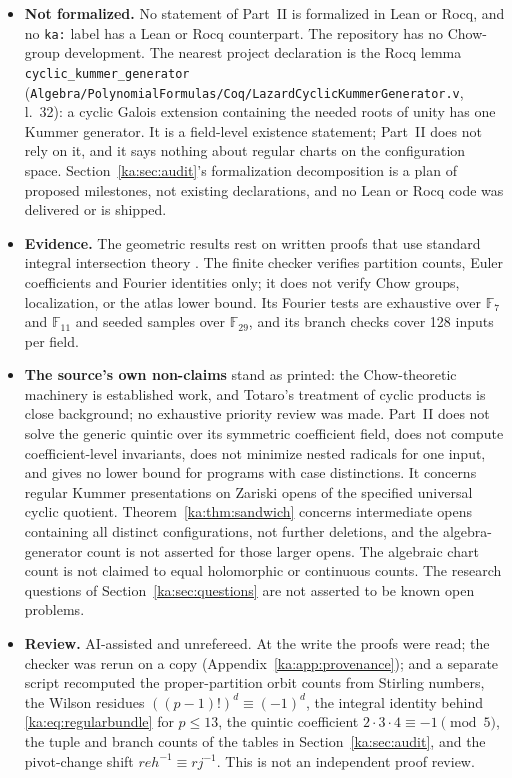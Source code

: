 \documentclass[11pt,a4paper]{article}
\theoremstyle{definition}
\theoremstyle{remark}
\newcommand{\F}{\mathbb F}
\newcommand{\code}[1]{{\small\nolinkurl{#1}}}
\begin{document}
\begin{itemize}
\item \textbf{Not formalized.} No statement of Part~II is formalized in Lean
or Rocq, and no \code{ka:} label has a Lean or Rocq counterpart. The
repository has no Chow-group development. The nearest project declaration
is the Rocq lemma \code{cyclic_kummer_generator}
(\code{Algebra/PolynomialFormulas/Coq/LazardCyclicKummerGenerator.v}, l.~32):
a cyclic Galois extension containing the needed roots of unity has one Kummer
generator. It is a field-level existence statement; Part~II does not rely on
it, and it says nothing about regular charts on the configuration space.
Section~\ref{ka:sec:audit}'s formalization decomposition is a plan of
proposed milestones, not existing declarations, and no Lean or Rocq code was
delivered or is shipped.
\item \textbf{Evidence.} The geometric results rest on written proofs that
use standard integral intersection theory
\cite{ka:Fulton,ka:Totaro,ka:EdidinGraham}. The finite checker verifies
partition counts, Euler coefficients and Fourier identities only; it does not
verify Chow groups, localization, or the atlas lower bound. Its Fourier tests
are exhaustive over $\F_7$ and $\F_{11}$ and seeded samples over $\F_{29}$,
and its branch checks cover 128 inputs per field.
\item \textbf{The source's own non-claims} stand as printed: the Chow-theoretic
machinery is established work, and Totaro's treatment of cyclic products is
close background; no exhaustive priority review was made. Part~II does not
solve the generic quintic over its symmetric coefficient field, does not
compute coefficient-level invariants, does not minimize nested radicals for
one input, and gives no lower bound for programs with case distinctions.
It concerns regular Kummer presentations on Zariski opens of the specified
universal cyclic quotient. Theorem~\ref{ka:thm:sandwich} concerns
intermediate opens containing all distinct configurations, not further
deletions, and the algebra-generator count is not asserted for those larger
opens. The algebraic chart count is not claimed to equal holomorphic or
continuous counts. The research questions of Section~\ref{ka:sec:questions}
are not asserted to be known open problems.
\item \textbf{Review.} AI-assisted and unrefereed. At the write the proofs
were read; the checker was rerun on a copy (Appendix~\ref{ka:app:provenance});
and a separate script recomputed the proper-partition orbit counts from
Stirling numbers, the Wilson residues $((p-1)!)^d\equiv(-1)^d$, the integral
identity behind \eqref{ka:eq:regularbundle} for $p\le13$, the quintic
coefficient $2\cdot3\cdot4\equiv-1\pmod5$, the tuple and branch counts of
the tables in Section~\ref{ka:sec:audit}, and the pivot-change shift
$reh^{-1}\equiv rj^{-1}$. This is not an independent proof review.
\end{itemize}
\end{document}
